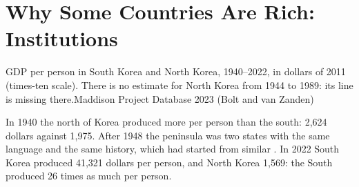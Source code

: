 \chapter{Why Some Countries Are Rich: Institutions}\label{ch:g9:institutions-and-prosperity}

\begin{openingchart}{GDP per person in South Korea and North Korea, 1940--2022, in dollars of 2011 (times-ten
scale). There is no estimate for North Korea from 1944 to 1989: its line is missing there.}{Maddison Project
Database 2023 (Bolt and van Zanden)}
\end{openingchart}

In 1940 the north of Korea produced more per person than the south: 2,624 dollars against 1,975. After
1948 the peninsula was two states with the same language and the same history, which had started from
similar . In 2022 South Korea produced 41,321 dollars per person, and North Korea 1,569: the South produced
26 times as much per person.

